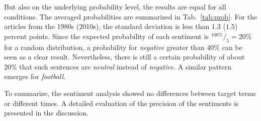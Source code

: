 \documentclass[10pt,a4paper,twocolumn]{scrartcl}
\begin{document}
But also on the underlying probability level, the results are equal for all conditions. The averaged probabilities are summarized in Tab.~\ref{tab:prob}. For the articles from the 1980s (2010s), the standard deviation is less than $1.3$ ($1.5$) percent points. Since the expected probability of each sentiment is $^{100\%}/_{5} = 20\%$  for a random distribution, a probability for \textit{negative} greater than $40\%$ can be seen as a clear result. Nevertheless, there is still a certain probability of about $20\%$ that such sentences are \textit{neutral} instead of \textit{negative}. A similar pattern emerges for \textit{football}.

To summarize, the sentiment analysis showed no differences between target terms or different times. A detailed evaluation of the precision of the sentiments is presented in the discussion.
\end{document}
